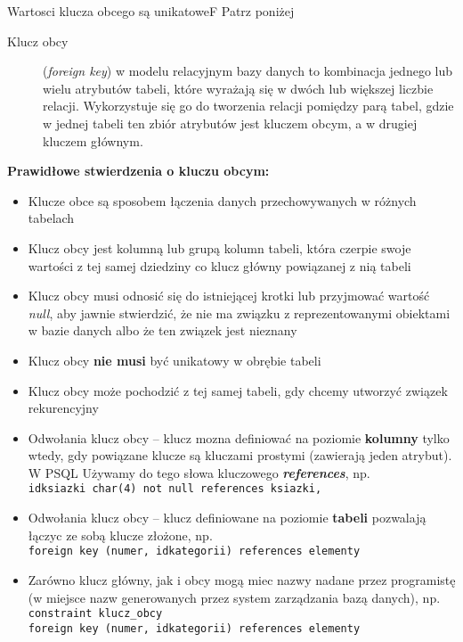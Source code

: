
{Wartosci klucza obcego są unikatowe}{F}
{Patrz poniżej}{\\}
\noindent
\begin{description}
	\item[Klucz obcy] (\textit{foreign key}) w modelu relacyjnym bazy danych to kombinacja jednego lub wielu atrybutów tabeli, które wyrażają się w dwóch lub większej liczbie relacji. Wykorzystuje się go do tworzenia relacji pomiędzy parą tabel, gdzie w jednej tabeli ten zbiór atrybutów jest kluczem obcym, a w drugiej kluczem głównym.
\end{description}
\noindent \textbf{Prawidłowe stwierdzenia o kluczu obcym:}
\begin{itemize}
  \item Klucze obce są sposobem łączenia danych przechowywanych w różnych tabelach
  \item Klucz obcy jest kolumną lub grupą kolumn tabeli, która czerpie swoje wartości z tej samej dziedziny co klucz główny powiązanej z nią tabeli
  \item Klucz obcy musi odnosić się do istniejącej krotki lub przyjmować wartość \textit{null}, aby jawnie stwierdzić, że nie ma związku z reprezentowanymi obiektami w bazie danych albo że ten związek jest nieznany
  \item Klucz obcy \textbf{nie musi} być unikatowy w obrębie tabeli
  \item Klucz obcy może pochodzić z tej samej tabeli, gdy chcemy utworzyć związek rekurencyjny 
  \item Odwołania klucz obcy – klucz mozna definiować na poziomie \textbf{kolumny} tylko wtedy, gdy powiązane klucze są kluczami prostymi (zawierają jeden atrybut). W PSQL Używamy do tego słowa kluczowego \textbf{\textit{references}}, np.\\
\lstinline[columns=fixed]{idksiazki char(4) not null references ksiazki,} 
\item Odwołania klucz obcy – klucz definiowane na poziomie \textbf{tabeli} pozwalają łączyc ze sobą klucze złożone, np.\\
\lstinline[columns=fixed]{foreign key (numer, idkategorii) references elementy} 
\item Zarówno klucz główny, jak i obcy mogą miec nazwy nadane przez programistę (w miejsce nazw generowanych przez system zarządzania bazą danych), np.\\
\lstinline[columns=fixed]{constraint klucz_obcy}\\ 
\hspace*{1.2cm}\lstinline[columns=fixed]{foreign key (numer, idkategorii) references elementy} 


\end{itemize}
